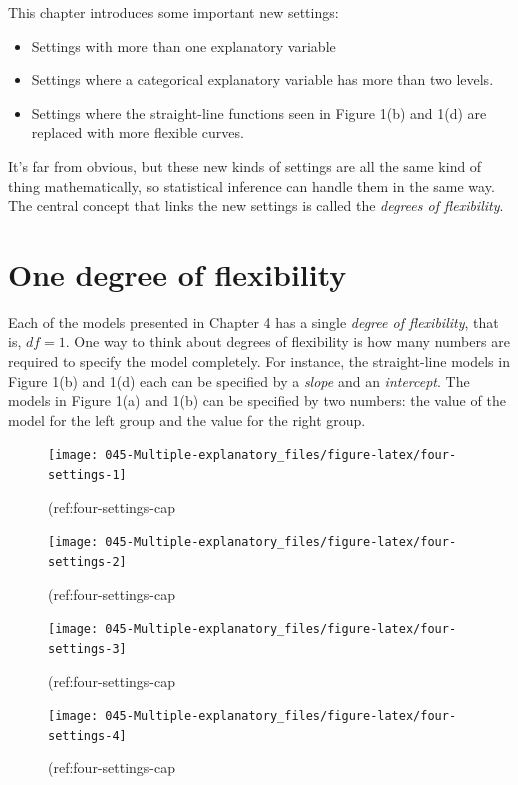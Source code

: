 \documentclass[]{book}
\providecommand{\tightlist}{%
  \setlength{\itemsep}{0pt}\setlength{\parskip}{0pt}}
\begin{document}
This chapter introduces some important new settings:

\begin{itemize}
\tightlist
\item
  Settings with more than one explanatory variable
\item
  Settings where a categorical explanatory variable has more than two levels.
\item
  Settings where the straight-line functions seen in Figure 1(b) and 1(d) are replaced with more flexible curves.
\end{itemize}

It's far from obvious, but these new kinds of settings are all the same kind of thing mathematically, so statistical inference can handle them in the same way. The central concept that links the new settings is called the \emph{degrees of flexibility}.

\hypertarget{one-degree-of-flexibility}{%
\section{One degree of flexibility}\label{one-degree-of-flexibility}}

Each of the models presented in Chapter 4 has a single \emph{degree of flexibility}, that is, \(df = 1\). One way to think about degrees of flexibility is how many numbers are required to specify the model completely. For instance, the straight-line models in Figure 1(b) and 1(d) each can be specified by a \emph{slope} and an \emph{intercept}. The models in Figure 1(a) and 1(b) can be specified by two numbers: the value of the model for the left group and the value for the right group.



\begin{figure}\texttt{[image: 045-Multiple-explanatory\_files/figure-latex/four-settings-1]} \caption{(ref:four-settings-cap}\label{fig:four-settings}
\end{figure}
\begin{figure}\texttt{[image: 045-Multiple-explanatory\_files/figure-latex/four-settings-2]} \caption{(ref:four-settings-cap}\label{fig:four-settings}
\end{figure}
\begin{figure}\texttt{[image: 045-Multiple-explanatory\_files/figure-latex/four-settings-3]} \caption{(ref:four-settings-cap}\label{fig:four-settings}
\end{figure}
\begin{figure}\texttt{[image: 045-Multiple-explanatory\_files/figure-latex/four-settings-4]} \caption{(ref:four-settings-cap}\label{fig:four-settings}
\end{figure}
\end{document}
